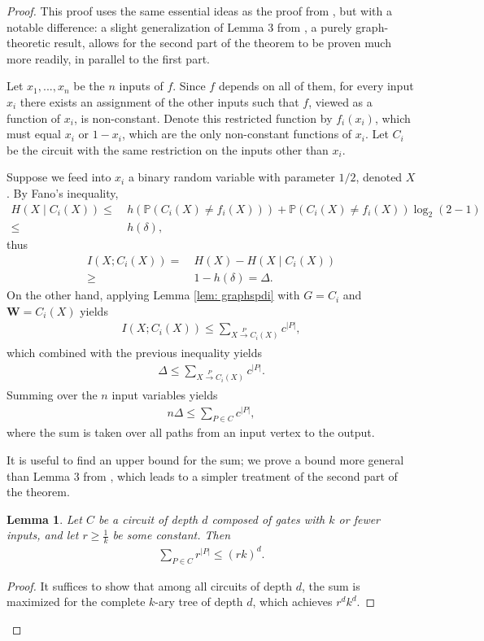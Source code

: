 \documentclass[12pt,reqno]{amsart}
\theoremstyle{plain} %
\newtheorem{lemma}[theorem]{Lemma}
\theoremstyle{remark}
\theoremstyle{definition}
\renewcommand{\P}{\mathbb P}
\newcommand{\W}{\mathbf W}
\begin{document}
\begin{proof}
This proof uses the same essential ideas as the proof from \cite{ES}, but with a notable difference: a slight generalization of Lemma 3 from \cite{ES}, a purely graph-theoretic result, allows for the second part of the theorem to be proven much more readily, in parallel to the first part.

    Let $x_1,...,x_n$ be the $n$ inputs of $f$. Since $f$ depends on all of them, for every input $x_i$ there exists an assignment of the other inputs such that $f$, viewed as a function of $x_i$, is non-constant. Denote this restricted function by $f_i(x_i)$, which must equal $x_i$ or $1-x_i$, which are the only non-constant functions of $x_i$. Let $C_i$ be the circuit with the same restriction on the inputs other than $x_i$.

    Suppose we feed into $x_i$ a binary random variable with parameter $1/2$, denoted $X$. By Fano's inequality,
    \begin{align}
        H(X\mid C_i(X))\le&\ h(\P(C_i(X)\ne f_i(X)))+\P(C_i(X)\ne f_i(X))\log_2(2-1)\\
        \le&\ h(\delta),
    \end{align}
    thus
    \begin{align}
        I(X;C_i(X))=&\ H(X)-H(X\mid C_i(X))\\
        \ge&\ 1-h(\delta)=\Delta.
    \end{align}
    On the other hand, applying Lemma \ref{lem: graphspdi} with $G=C_i$ and $\W=C_i(X)$ yields
    \begin{align}
        I(X;C_i(X))\le\sum_{X\xrightarrow[]{P}C_i(X)}c^{|P|},
    \end{align}
    which combined with the previous inequality yields
    \begin{align}
        \Delta\le\sum_{X\xrightarrow[]{P}C_i(X)}c^{|P|}.
    \end{align}
    Summing over the $n$ input variables yields
    \begin{align}\label{eqn: sumbound}
        n\Delta\le\sum_{P\in C}c^{|P|},
    \end{align}
    where the sum is taken over all paths from an input vertex to the output.

    It is useful to find an upper bound for the sum; we prove a bound more general than Lemma 3 from \cite{ES}, which leads to a simpler treatment of the second part of the theorem. 
    
    \begin{lemma}\label{lem: treesum}
        Let $C$ be a circuit of depth $d$ composed of gates with $k$ or fewer inputs, and let $r\ge\frac{1}{k}$ be some constant. Then
        \begin{align}
            \sum_{P\in C}r^{|P|}\le (rk)^d.
        \end{align}
    \end{lemma}
\begin{proof}
    It suffices to show that among all circuits of depth $d$, the sum is maximized for the complete $k$-ary tree of depth $d$, which achieves $r^dk^d$.


\end{proof}
\end{proof}
\end{document}
